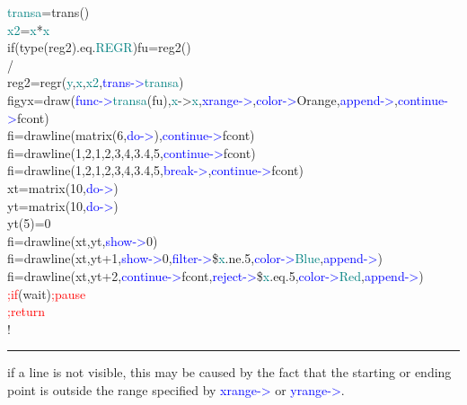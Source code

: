 \begin{example}[drawlineex]
\textcolor{teal}{transa}=\textcolor{VioletRed}{trans}()\\ 
\textcolor{teal}{x2}=\textcolor{teal}{x}*\textcolor{teal}{x}\\ 
\textcolor{VioletRed}{if}(\textcolor{VioletRed}{type}(reg2).eq.\textcolor{teal}{REGR})fu=reg2()\\ 
/                                                                                              \\ 
reg2=\textcolor{VioletRed}{regr}(\textcolor{teal}{y},\textcolor{teal}{x},\textcolor{teal}{x2},\textcolor{blue}{trans->}\textcolor{teal}{transa})\\ 
figyx=\textcolor{VioletRed}{draw}(\textcolor{blue}{func->}\textcolor{teal}{transa}(fu),\textcolor{teal}{x}->\textcolor{teal}{x},\textcolor{blue}{xrange->},\textcolor{blue}{color->}Orange,\textcolor{blue}{append->},\textcolor{blue}{continue->}fcont)\\ 
fi=\textcolor{VioletRed}{drawline}(\textcolor{VioletRed}{matrix}(6,\textcolor{blue}{do->}),\textcolor{blue}{continue->}fcont)\\ 
fi=\textcolor{VioletRed}{drawline}(1,2,1,2,3,4,3.4,5,\textcolor{blue}{continue->}fcont)\\ 
fi=\textcolor{VioletRed}{drawline}(1,2,1,2,3,4,3.4,5,\textcolor{blue}{break->},\textcolor{blue}{continue->}fcont)\\ 
xt=\textcolor{VioletRed}{matrix}(10,\textcolor{blue}{do->})\\ 
yt=\textcolor{VioletRed}{matrix}(10,\textcolor{blue}{do->})\\ 
yt(5)=0\\ 
fi=\textcolor{VioletRed}{drawline}(xt,yt,\textcolor{blue}{show->}0)\\ 
fi=\textcolor{VioletRed}{drawline}(xt,yt+1,\textcolor{blue}{show->}0,\textcolor{blue}{filter->}\$\textcolor{teal}{x}.ne.5,\textcolor{blue}{color->}\textcolor{teal}{Blue},\textcolor{blue}{append->})\\ 
fi=\textcolor{VioletRed}{drawline}(xt,yt+2,\textcolor{blue}{continue->}fcont,\textcolor{blue}{reject->}\$\textcolor{teal}{x}.eq.5,\textcolor{blue}{color->}\textcolor{teal}{Red},\textcolor{blue}{append->})\\ 
\textcolor{Red}{;if}(wait)\textcolor{Red}{;pause}\\ 
\textcolor{Red}{;return}\\ 
	!                      \\ 
\end{example} 
\vspace{-7mm} \rule{5cm}{0.1pt} 
\onehalfspacing 
\begin{note} 
if a line is not visible, this may be caused by the fact that 
the starting or ending point is outside the range specified by \textcolor{blue}{xrange->} or \textcolor{blue}{yrange->}. 
\end{note} 
